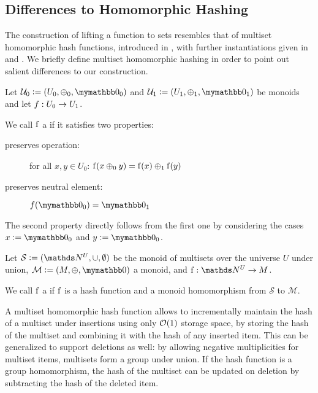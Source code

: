 \subsection{Differences to Homomorphic Hashing}

The construction of lifting a function to sets resembles that of multiset homomorphic hash functions, introduced in \cite{clarke2003incremental}, with further instantiations given in \cite{cathalo2009comparing} and \cite{maitin2017elliptic}. We briefly define multiset homomorphic hashing in order to point out salient differences to our construction.

\begin{definition}
Let $\mathcal{U}_0 \defeq (U_0, \groupaddsym_0, \neutraladd_0)$ and $\mathcal{U}_1 \defeq (U_1, \groupaddsym_1, \neutraladd_1)$ be monoids and let ${f}: {U_0} \rightarrow {U_1}$.

We call $\operatorname{f}$ a  if it satisfies two properties:

\begin{description}
  \item[preserves operation:] for all $x, y \in U_0$: $\operatorname{f}(x \oplus_0 y) = \operatorname{f}(x) \oplus_1 \operatorname{f}(y)$
  \item[preserves neutral element:] $f(\neutraladd_0) = \neutraladd_1$
\end{description}

The second property directly follows from the first one by considering the cases $x \defeq \neutraladd_0$ and $y \defeq \neutraladd_0$.
\end{definition}

\begin{definition}
Let $\mathcal{S} \defeq (\N^U, \cup, \emptyset)$ be the monoid of multisets over the universe $U$ under union, $\mathcal{M} \defeq (M, \groupaddsym, \neutraladd)$ a monoid, and $\fun{\f}{\N^U}{M}$.

We call $\operatorname{f}$ a  if $\operatorname{f}$ is a hash function and a monoid homomorphism from $\mathcal{S}$ to $\mathcal{M}$.
\end{definition}

A multiset homomorphic hash function allows to incrementally maintain the hash of a multiset under insertions using only $\mathcal{O}(1)$ storage space, by storing the hash of the multiset and combining it with the hash of any inserted item. This can be generalized to support deletions as well: by allowing negative multiplicities for multiset items, multisets form a group under union. If the hash function is a group homomorphism, the hash of the multiset can be updated on deletion by subtracting the hash of the deleted item.

